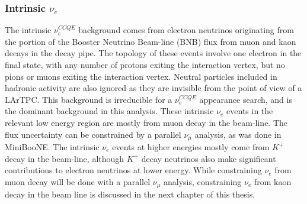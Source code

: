 \subsubsection{Intrinsic $\nu_e$}
The intrinsic $\nu_e^{CCQE}$ background comes from electron neutrinos originating from the portion of the Booster Neutrino Beam-line (BNB) flux from muon and kaon decays in the decay pipe. The topology of these events involve one electron in the final state, with any number of protons exiting the interaction vertex, but no pions or muons exiting the interaction vertex. Neutral particles included in hadronic activity are also ignored as they are invisible from the point of view of a LArTPC. This background is irreducible for a $\nu_e^{CCQE}$ appearance search, and is the dominant background in this analysis. These intrinsic $\nu_e$ events in the relevant low energy region are mostly from muon decay in the beam-line. The flux uncertainty can be constrained by a parallel $\nu_\mu$ analysis, as was done in MiniBooNE. The intrinsic $\nu_e$ events at higher energies mostly come from $K^+$ decay in the beam-line, although $K^+$ decay neutrinos also make significant contributions to electron neutrinos at lower energy. While constraining $\nu_e$ from muon decay will be done with a parallel $\nu_\mu$ analysis, constraining $\nu_e$ from kaon decay in the beam line is discussed in the next chapter of this thesis.

